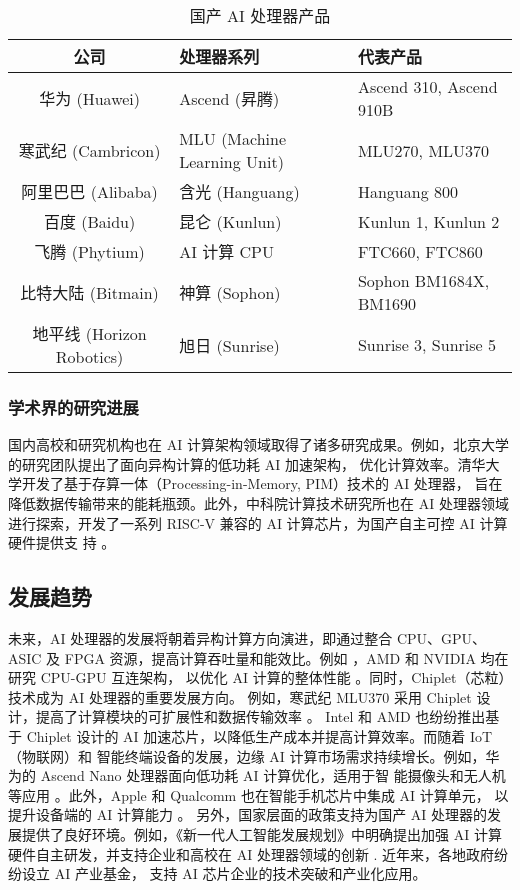 \begin{table}
    \centering
    \caption{国产 AI 处理器产品}
    \label{tab:ai_chips_1}
    \begin{tabular}{cll} %
      \toprule
      公司   & 处理器系列                                       & 代表产品                          \\
      \midrule
      {华为 (Huawei)} & Ascend (昇腾) & Ascend 310, Ascend 910B \\ 
      {寒武纪 (Cambricon)} & MLU (Machine Learning Unit) & MLU270, MLU370 \\ 
      {阿里巴巴 (Alibaba)} & 含光 (Hanguang) & Hanguang 800 \\ 
      {百度 (Baidu)} & 昆仑 (Kunlun) & Kunlun 1, Kunlun 2 \\ 
      {飞腾 (Phytium)} & AI 计算 CPU & FTC660, FTC860 \\ 
      {比特大陆 (Bitmain)} & 神算 (Sophon) & Sophon BM1684X, BM1690 \\ 
      {地平线 (Horizon Robotics)} & 旭日 (Sunrise) & Sunrise 3, Sunrise 5 \\ 
 
      \bottomrule
    \end{tabular}
\end{table}

\subsubsection{学术界的研究进展}

国内高校和研究机构也在 AI 计算架构领域取得了诸多研究成果。例如，北京大学的研究团队提出了面向异构计算的低功耗 AI 加速架构，
优化计算效率。清华大学开发了基于存算一体（Processing-in-Memory, PIM）技术的 AI 处理器，
旨在降低数据传输带来的能耗瓶颈。此外，中科院计算技术研究所也在 AI 处理器领域进行探索，开发了一系列 RISC-V 兼容的 AI 计算芯片，为国产自主可控 AI 计算硬件提供支
持 。


\subsection{发展趋势}
未来，AI 处理器的发展将朝着异构计算方向演进，即通过整合 CPU、GPU、ASIC 及 FPGA 资源，提高计算吞吐量和能效比。例如
，AMD 和 NVIDIA 均在研究 CPU-GPU 互连架构，
以优化 AI 计算的整体性能 \cite{mishty2024chiplet}。同时，Chiplet（芯粒）技术成为 AI 处理器的重要发展方向。
例如，寒武纪 MLU370 采用 Chiplet 设计，提高了计算模块的可扩展性和数据传输效率 。
Intel 和 AMD 也纷纷推出基于 Chiplet 设计的 AI 加速芯片，以降低生产成本并提高计算效率。而随着 IoT（物联网）和
智能终端设备的发展，边缘 AI 计算市场需求持续增长。例如，华为的 Ascend Nano 处理器面向低功耗 AI 计算优化，适用于智
能摄像头和无人机等应用 。此外，Apple 和 Qualcomm 也在智能手机芯片中集成 AI 计算单元，
以提升设备端的 AI 计算能力 。
另外，国家层面的政策支持为国产 AI 处理器的发展提供了良好环境。例如，《新一代人工智能发展规划》中明确提出加强 AI 计算
硬件自主研发，并支持企业和高校在 AI 处理器领域的创新 . 近年来，各地政府纷纷设立 AI 产业基金，
支持 AI 芯片企业的技术突破和产业化应用。

